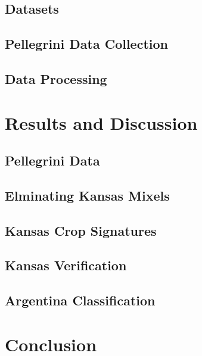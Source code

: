 \documentclass[draft,compress]{beamer}
\begin{document}
\subsection{Datasets}


\subsection{Pellegrini Data Collection}


\subsection{Data Processing}


\section{Results and Discussion}

\subsection{Pellegrini Data}

\subsection{Elminating Kansas Mixels}

\subsection{Kansas Crop Signatures}

\subsection{Kansas Verification}

\subsection{Argentina Classification}


\section{Conclusion}
\end{document}
